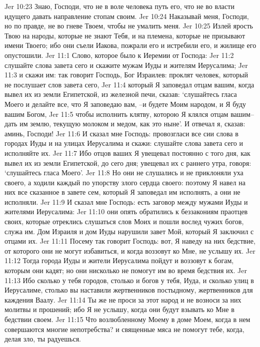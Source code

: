 Jer 10:23  Знаю, Господи, что не в воле человека путь его, что не во власти идущего давать направление стопам своим.
Jer 10:24  Наказывай меня, Господи, но по правде, не во гневе Твоем, чтобы не умалить меня.
Jer 10:25  Излей ярость Твою на народы, которые не знают Тебя, и на племена, которые не призывают имени Твоего; ибо они съели Иакова, пожрали его и истребили его, и жилище его опустошили.
Jer 11:1  Слово, которое было к Иеремии от Господа:
Jer 11:2  слушайте слова завета сего и скажите мужам Иуды и жителям Иерусалима;
Jer 11:3  и скажи им: так говорит Господь, Бог Израилев: проклят человек, который не послушает слов завета сего,
Jer 11:4  который Я заповедал отцам вашим, когда вывел их из земли Египетской, из железной печи, сказав: `слушайтесь гласа Моего и делайте все, что Я заповедаю вам, --и будете Моим народом, и Я буду вашим Богом,
Jer 11:5  чтобы исполнить клятву, которою Я клялся отцам вашим--дать им землю, текущую молоком и медом, как это ныне'. И отвечал я, сказав: аминь, Господи!
Jer 11:6  И сказал мне Господь: провозгласи все сии слова в городах Иуды и на улицах Иерусалима и скажи: слушайте слова завета сего и исполняйте их.
Jer 11:7  Ибо отцов ваших Я увещевал постоянно с того дня, как вывел их из земли Египетской, до сего дня; увещевал их с раннего утра, говоря: `слушайтесь гласа Моего'.
Jer 11:8  Но они не слушались и не приклоняли уха своего, а ходили каждый по упорству злого сердца своего: поэтому Я навел на них все сказанное в завете сем, который Я заповедал им исполнять, а они не исполняли.
Jer 11:9  И сказал мне Господь: есть заговор между мужами Иуды и жителями Иерусалима:
Jer 11:10  они опять обратились к беззакониям праотцев своих, которые отреклись слушаться слов Моих и пошли вослед чужих богов, служа им. Дом Израиля и дом Иуды нарушили завет Мой, который Я заключил с отцами их.
Jer 11:11  Посему так говорит Господь: вот, Я наведу на них бедствие, от которого они не могут избавиться, и когда воззовут ко Мне, не услышу их.
Jer 11:12  Тогда города Иуды и жители Иерусалима пойдут и воззовут к богам, которым они кадят; но они нисколько не помогут им во время бедствия их.
Jer 11:13  Ибо сколько у тебя городов, столько и богов у тебя, Иуда, и сколько улиц в Иерусалиме, столько вы наставили жертвенников постыдному, жертвенников для каждения Ваалу.
Jer 11:14  Ты же не проси за этот народ и не возноси за них молитвы и прошений; ибо Я не услышу, когда они будут взывать ко Мне в бедствии своем.
Jer 11:15  Что возлюбленному Моему в доме Моем, когда в нем совершаются многие непотребства? и священные мяса не помогут тебе, когда, делая зло, ты радуешься.
